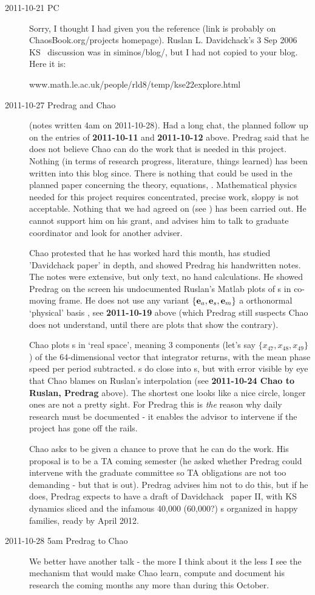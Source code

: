 \begin{description}
\item[2011-10-21 PC] Sorry, I thought I had given you the reference (link
is probably on ChaosBook.org/projects homepage). Ruslan L. Davidchack's 3
Sep 2006 KS \eqva\ discussion was in siminos/blog/, but I had not copied
to your blog. Here it is:

{www.math.le.ac.uk/people/rld8/temp/kse22explore.html}

\item[2011-10-27 Predrag and Chao] (notes written 4am on 2011-10-28). Had
a long chat, the planned follow up on the entries of {\bf 2011-10-11} and
{\bf 2011-10-12} above. Predrag said that he does not believe Chao can do
the work that is needed in this project. Nothing (in terms of research
progress, literature, things learned) has been written into this blog
since. There is nothing that could be used in the planned paper
concerning the theory, equations, \etc. Mathematical physics needed for
this project requires concentrated, precise work, sloppy is not
acceptable. Nothing that we had agreed on (see ) has
been carried out. He cannot support him on his grant, and advises him to
talk to graduate coordinator and look for another adviser.

Chao protested that he has worked hard this month, has studied
'Davidchack paper' in depth, and showed Predrag his handwritten
notes. The notes were extensive, but only text, no hand calculations. He
showed Predrag on the screen his undocumented Ruslan's Matlab plots of
\rpo s in co-moving frame. He does not use any variant $\{{\bf e}_a, {\bf e}_s,
{\bf e}_m\}$ a orthonormal `physical' basis , see {\bf
2011-10-19} above (which Predrag still suspects Chao does not
understand, until there are plots that show the contrary).

Chao plots \rpo s in `real space', meaning 3 components (let's
say $\{x_{47}, x_{48}, x_{49}\}$) of the 64-dimensional vector that
integrator returns, with the mean phase speed per period subtracted. \Rpo
s do close into \po s, but with error visible by eye that Chao blames on
Ruslan's interpolation (see {\bf 2011-10-24 Chao to Ruslan, Predrag}
above). The shortest one looks like a nice circle, longer ones are not a
pretty sight. For Predrag this is \emph{the} reason why daily research
must be documented - it enables the advisor to intervene if the project
has gone off the rails.

Chao asks to be given a chance to prove that he can do the work. His
proposal is to be a TA coming semester (he asked whether Predrag could
intervene with the graduate committee so TA obligations are not too
demanding - but that is out). Predrag advises him not to do this, but if
he does, Predrag expects to have a draft of Davidchack \etal\ paper
II, with KS dynamics sliced and the infamous 40,000 (60,000?) \rpo s
organized in happy families, ready by April 2012.

\item[2011-10-28 5am Predrag to Chao]
We better have another talk - the more I think about it the less I see
the mechanism that would make Chao learn, compute and document his
research the coming months any more than during this October.


\end{description}
